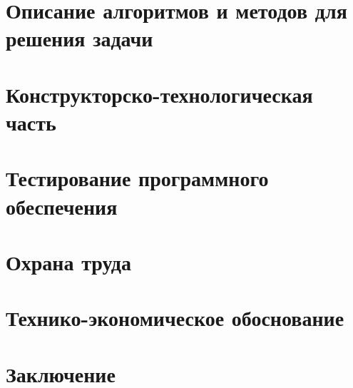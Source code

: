 






\newpage
{}
\renewcommand\contentsname{\hfill Содержание \hfill}
\tableofcontents

\newpage
\section{Описание алгоритмов и методов для решения задачи}
\setcounter{figure}{0}

\newpage
\section{Конструкторско-технологическая часть}
\setcounter{figure}{0}

\newpage
\section{Тестирование программного обеспечения}
\setcounter{figure}{0}

\newpage
\section{Охрана труда}
\setcounter{figure}{0}

\newpage
\section{Технико-экономическое обоснование}
\setcounter{figure}{0}

\newpage
\section{Заключение}
\setcounter{figure}{0}

\newpage
\renewcommand{\refname}{Список использованных источников}




